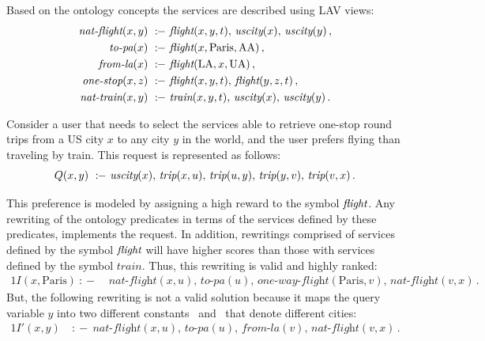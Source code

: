 \documentclass{llncs}
\newcommand{\qrule}{:\!\!-}
\newcommand{\flight}{\text{\it flight}}
\newcommand{\UScity}{\text{\it uscity}}
\newcommand{\trip}{\textit{trip}}
\newcommand{\train}{\textit{train}}
\renewcommand{\AA}{\text{AA}}
\newcommand{\UA}{\text{UA}}
\newcommand{\PA}{\text{Paris}}
\newcommand{\LA}{\text{LA}}
\newcommand{\nationaltlight}{\textit{nat-flight}}
\newcommand{\onewayflight}{\textit{one-way-flight}}
\newcommand{\nationaltrain}{\textit{nat-train}}
\newcommand{\onestop}{\textit{one-stop}}
\newcommand{\toPA}{\textit{to-pa}}
\newcommand{\fromLA}{\textit{from-la}}
\begin{document}
Based on the ontology concepts the services are described using LAV views:
\begin{alignat*}{1}
\nationaltlight(x,y)\ &\qrule\ \flight(x,y,t),\,\UScity(x),\,\UScity(y)\,, \\
\toPA(x)\             &\qrule\ \flight(x,\PA,\AA)\,, \\
\fromLA(x)\           &\qrule\ \flight(\LA,x,\UA)\,, \\
\onestop(x,z)\          &\qrule\ \flight(x,y,t),\,\flight(y,z,t)\,, \\
\nationaltrain(x,y)\  &\qrule\ \train(x,y,t),\,\UScity(x),\,\UScity(y)\,. 
\end{alignat*}

Consider a user that needs to select the services able to
retrieve one-stop round trips from a US city $x$ to any city $y$ in the world, and the user prefers  flying than traveling by train. This request is represented as follows:
\[ Q(x,y)\ \qrule\ \UScity(x),\,\trip(x,u),\,\trip(u,y),\,\trip(y,v),\,\trip(v,x)\,. \]

 This preference is modeled by assigning a high reward to the symbol $\flight$. Any rewriting of the ontology predicates in terms of the services defined by these predicates, implements the request.
In addition, rewritings comprised of services defined by the symbol $\flight$ will have higher scores than those with services defined by the symbol $\train$.
Thus, this rewriting is  valid and  highly ranked:
\begin{alignat*}{1}
I(x,\PA)\ \qrule\ &\nationaltlight(x,u),\,\toPA(u),\, \onewayflight(\PA,v),\,\nationaltlight(v,x)\,. 
\end{alignat*}
But, the following rewriting is not a valid solution because it maps the query variable $y$ into two different constants \PA\ and \LA\ that denote different cities:
\begin{alignat*}{1}
 I'(x,y)\  &\qrule\ \nationaltlight(x,u),\,\toPA(u),\,\fromLA(v),\,\nationaltlight(v,x)\,.
\end{alignat*}
\end{document}

